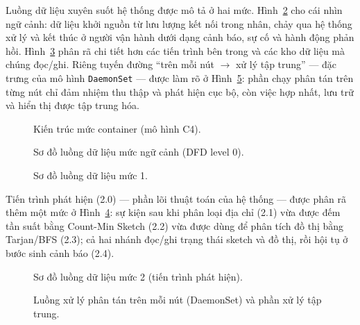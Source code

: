 Luồng dữ liệu xuyên suốt hệ thống được mô tả ở hai mức. Hình~\ref{fig:dfd0} cho cái
nhìn ngữ cảnh: dữ liệu khởi nguồn từ lưu lượng kết nối trong nhân, chảy qua hệ thống
xử lý và kết thúc ở người vận hành dưới dạng cảnh báo, sự cố và hành động phản hồi.
Hình~\ref{fig:dfd1} phân rã chi tiết hơn các tiến trình bên trong và các kho dữ liệu
mà chúng đọc/ghi. Riêng tuyến đường ``trên mỗi nút $\rightarrow$ xử lý tập trung''
--- đặc trưng của mô hình \texttt{DaemonSet} --- được làm rõ ở
Hình~\ref{fig:agent-flow}: phần chạy phân tán trên từng nút chỉ đảm nhiệm thu thập và
phát hiện cục bộ, còn việc hợp nhất, lưu trữ và hiển thị được tập trung hóa.

\begin{figure}[H]
  \centering
  \resizebox{0.72\linewidth}{!}{}
  \caption{Kiến trúc mức container (mô hình C4).}
  \label{fig:arch-c4}
\end{figure}

\begin{figure}[H]
  \centering
  \resizebox{0.85\linewidth}{!}{}
  \caption{Sơ đồ luồng dữ liệu mức ngữ cảnh (DFD level 0).}
  \label{fig:dfd0}
\end{figure}

\begin{figure}[H]
  \centering
  \resizebox{0.95\linewidth}{!}{}
  \caption{Sơ đồ luồng dữ liệu mức 1.}
  \label{fig:dfd1}
\end{figure}

Tiến trình phát hiện (2.0) --- phần lõi thuật toán của hệ thống --- được phân rã thêm một
mức ở Hình~\ref{fig:dfd2}: sự kiện sau khi phân loại địa chỉ (2.1) vừa được đếm tần suất
bằng Count-Min Sketch (2.2) vừa được dùng để phân tích đồ thị bằng Tarjan/BFS (2.3); cả
hai nhánh đọc/ghi trạng thái sketch và đồ thị, rồi hội tụ ở bước sinh cảnh báo (2.4).

\begin{figure}[H]
  \centering
  \resizebox{0.95\linewidth}{!}{}
  \caption{Sơ đồ luồng dữ liệu mức 2 (tiến trình phát hiện).}
  \label{fig:dfd2}
\end{figure}

\begin{figure}[H]
  \centering
  \resizebox{0.95\linewidth}{!}{}
  \caption{Luồng xử lý phân tán trên mỗi nút (DaemonSet) và phần xử lý tập trung.}
  \label{fig:agent-flow}
\end{figure}

